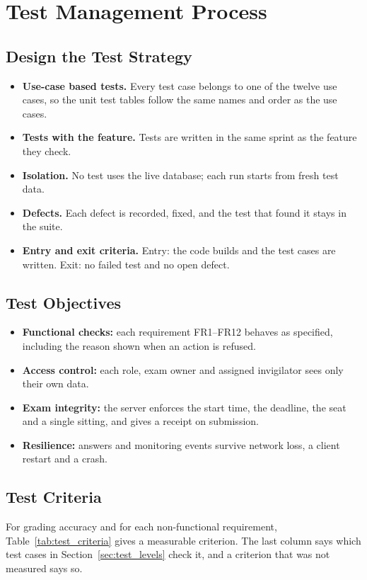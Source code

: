 \section{Test Management Process}
\label{sec:test_management}

\subsection{Design the Test Strategy}
\begin{itemize}[nosep]
  \item \textbf{Use-case based tests.} Every test case belongs to one of the twelve use cases, so the unit test tables follow the same names and order as the use cases.
  \item \textbf{Tests with the feature.} Tests are written in the same sprint as the feature they check.
  \item \textbf{Isolation.} No test uses the live database; each run starts from fresh test data.
  \item \textbf{Defects.} Each defect is recorded, fixed, and the test that found it stays in the suite.
  \item \textbf{Entry and exit criteria.} Entry: the code builds and the test cases are written. Exit: no failed test and no open defect.
\end{itemize}

\subsection{Test Objectives}
\begin{itemize}[nosep]
  \item \textbf{Functional checks:} each requirement FR1--FR12 behaves as specified, including the reason shown when an action is refused.
  \item \textbf{Access control:} each role, exam owner and assigned invigilator sees only their own data.
  \item \textbf{Exam integrity:} the server enforces the start time, the deadline, the seat and a single sitting, and gives a receipt on submission.
  \item \textbf{Resilience:} answers and monitoring events survive network loss, a client restart and a crash.
\end{itemize}

\subsection{Test Criteria}
For grading accuracy and for each non-functional requirement, Table~\ref{tab:test_criteria} gives a measurable criterion. The last column says which test cases in Section~\ref{sec:test_levels} check it, and a criterion that was not measured says so.

